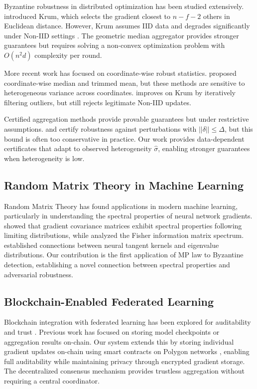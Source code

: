 \documentclass[runningheads]{llncs}
\begin{document}
Byzantine robustness in distributed optimization has been studied extensively. \cite{krum} introduced Krum, which selects the gradient closest to $n-f-2$ others in Euclidean distance. However, Krum assumes IID data and degrades significantly under Non-IID settings \cite{non_iid_challenges}. The geometric median aggregator \cite{geometric_median} provides stronger guarantees but requires solving a non-convex optimization problem with $O(n^2 d)$ complexity per round.

More recent work has focused on coordinate-wise robust statistics. \cite{byzantine_ml} proposed coordinate-wise median and trimmed mean, but these methods are sensitive to heterogeneous variance across coordinates. \cite{bulyan} improves on Krum by iteratively filtering outliers, but still rejects legitimate Non-IID updates.

Certified aggregation methods provide provable guarantees but under restrictive assumptions. \cite{crfl} and \cite{byzshield} certify robustness against perturbations with $||\delta|| \leq \Delta$, but this bound is often too conservative in practice. Our work provides data-dependent certificates that adapt to observed heterogeneity $\hat{\sigma}$, enabling stronger guarantees when heterogeneity is low.

\subsection{Random Matrix Theory in Machine Learning}

Random Matrix Theory has found applications in modern machine learning, particularly in understanding the spectral properties of neural network gradients. \cite{rmt_gradients} showed that gradient covariance matrices exhibit spectral properties following limiting distributions, while \cite{rmt_neural} analyzed the Fisher information matrix spectrum. \cite{spectral_analysis} established connections between neural tangent kernels and eigenvalue distributions. Our contribution is the first application of MP law \cite{mp_law} to Byzantine detection, establishing a novel connection between spectral properties and adversarial robustness.

\subsection{Blockchain-Enabled Federated Learning}

Blockchain integration with federated learning has been explored for auditability and trust \cite{blockchain_fl}. Previous work has focused on storing model checkpoints or aggregation results on-chain. Our system extends this by storing individual gradient updates on-chain using smart contracts on Polygon networks \cite{blockchain_smart}, enabling full auditability while maintaining privacy through encrypted gradient storage. The decentralized consensus mechanism \cite{blockchain_consensus} provides trustless aggregation without requiring a central coordinator.
\end{document}
